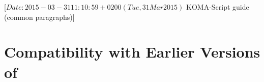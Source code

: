 %
%
%
%
%
%
%
%
% 
%
%
%
%

                 [$Date: 2015-03-31 11:10:59 +0200 (Tue, 31 Mar 2015) $
                  KOMA-Script guide (common paragraphs)]


\makeatletter
{}%
%
%
%
\makeatother


\section{Compatibility with Earlier Versions of \KOMAScript}
\ifshortversion\IgnoreThisfalse{}\fi%
\ifIgnoreThis %

